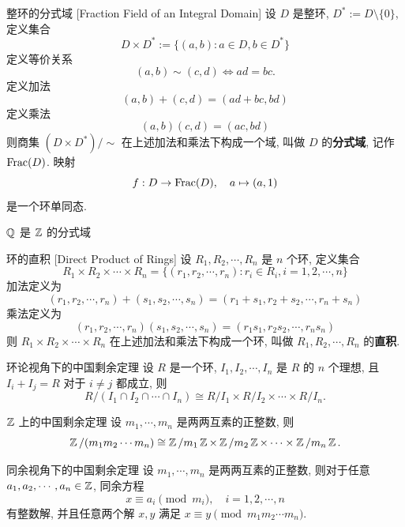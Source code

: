         \begin{dfn}
            {整环的分式域}
            [Fraction Field of an Integral Domain]
            设 \(D\) 是整环, \(D^*:=D\setminus\{0\}\), 定义集合
            \[D\times D^*:= \{(a,b): a\in D, b\in D^*\}\]
            定义等价关系
            \[(a,b)\sim (c,d)\iff ad=bc.\]
            定义加法
            \[(a,b)+(c,d)=(ad+bc, bd)\]
            定义乘法
            \[(a,b)(c,d)=(ac, bd)\]
            则商集 \((D\times D^*)/\sim\) 在上述加法和乘法下构成一个域, 叫做 \(D\) 的\textbf{分式域}, 记作 \(\operatorname{Frac}(D)\). 映射
            \[f: D\to \operatorname{Frac}(D), \quad a\mapsto (a,1)\]
            是一个环单同态.
        \end{dfn}

        \begin{ins}
            {\(\operatorname{\mathbb{Q}}\) 是 \(\operatorname{\mathbb{Z}}\) 的分式域}
        \end{ins}

        \begin{dfn}
            {环的直积}
            [Direct Product of Rings]
            设 \(R_1, R_2, \cdots, R_n\) 是 \(n\) 个环, 定义集合
            \[R_1\times R_2\times\cdots\times R_n=\{(r_1,r_2,\cdots,r_n): r_i\in R_i, i=1,2,\cdots,n\}\]
            加法定义为
            \[(r_1,r_2,\cdots,r_n)+(s_1,s_2,\cdots,s_n)=(r_1+s_1, r_2+s_2, \cdots, r_n+s_n)\]
            乘法定义为
            \[(r_1,r_2,\cdots,r_n)(s_1,s_2,\cdots,s_n)=(r_1 s_1, r_2 s_2, \cdots, r_n s_n)\]
            则 \(R_1\times R_2\times\cdots\times R_n\) 在上述加法和乘法下构成一个环, 叫做 \(R_1, R_2, \cdots, R_n\) 的\textbf{直积}.
        \end{dfn}

        \begin{thm}
            {环论视角下的中国剩余定理}
            设 \(R\) 是一个环, \(I_1, I_2, \cdots, I_n\) 是 \(R\) 的 \(n\) 个理想, 且 \(I_i+I_j=R\) 对于 \(i\neq j\) 都成立, 则
            \[R/(I_1\cap I_2\cap\cdots\cap I_n)\cong R/I_1\times R/I_2\times\cdots\times R/I_n.\]
        \end{thm}

        \begin{crl}
            {\(\operatorname{\mathbb{Z}}\) 上的中国剩余定理}
            设 \(m_1, \cdots, m_n\) 是两两互素的正整数, 则
            \[\operatorname{\mathbb{Z}}/(m_1 m_2 \cdots m_n)\cong \operatorname{\mathbb{Z}}/m_1\operatorname{\mathbb{Z}}\times \operatorname{\mathbb{Z}}/m_2\operatorname{\mathbb{Z}}\times\cdots\times \operatorname{\mathbb{Z}}/m_n\operatorname{\mathbb{Z}}.\]
        \end{crl}

        \begin{crl}
            {同余视角下的中国剩余定理}
            设 \(m_1, \cdots, m_n\) 是两两互素的正整数, 则对于任意 \(a_1, a_2, \cdots, a_n\in\operatorname{\mathbb{Z}}\), 同余方程
            \[x\equiv a_i \pmod{m_i}, \quad i=1,2,\cdots,n\]
            有整数解, 并且任意两个解 \(x,y\) 满足 \(x\equiv y \pmod{m_1 m_2 \cdots m_n}\).
        \end{crl}

